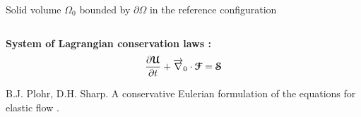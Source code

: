 \begin{frame}
\begin{block}{Solid volume $\Omega_0$ bounded by $\partial \Omega$ in the reference configuration}
\begin{footnotesize}
\begin{columns}
\begin{column}{0.5\textwidth}
        \end{column}
      \end{columns}
      \pause
      \textbf{\normalsize System of Lagrangian conservation laws \cite{Plohr}:}
      \begin{equation*}
        \frac{\partial {\boldsymbol{\mathcal{U}}}}{\partial t} + {\overrightarrow{\nabla}}_0 \cdot {\boldsymbol{\mathcal{F}}} = {\boldsymbol{\mathcal{S}}}
      \end{equation*}
    \end{footnotesize}
    {\tiny
      \usebibitemtemplate{\color{structure}\insertbiblabel} 
      \usebibliographyblocktemplate{\color{structure}}{\color{black}}{\color{structure!75}}{\color{structure!75}} 
      \begin{thebibliography}{ThomasEM}
        B.J. Plohr, D.H. Sharp.
        \newblock A conservative Eulerian formulation of the equations for elastic flow
        .
      \end{thebibliography}}
  \end{block}
  
\end{frame}


